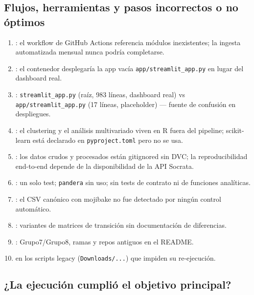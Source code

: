 \subsection{Flujos, herramientas y pasos incorrectos o no óptimos}

\begin{enumerate}
  \item {}: el workflow de GitHub Actions referencia módulos
        inexistentes; la ingesta automatizada mensual nunca podría completarse.
  \item {}: el contenedor desplegaría la app
        vacía \texttt{app/streamlit\_app.py} en lugar del dashboard real.
  \item {}: \texttt{streamlit\_app.py} (raíz, 983
        líneas, dashboard real) vs \texttt{app/streamlit\_app.py} (17 líneas,
        placeholder) — fuente de confusión en despliegues.
  \item {}: el clustering y el análisis multivariado
        viven en R fuera del pipeline; scikit-learn está declarado en
        \texttt{pyproject.toml} pero no se usa.
  \item {}: los datos crudos y procesados
        están gitignored sin DVC; la reproducibilidad end-to-end depende de la
        disponibilidad de la API Socrata.
  \item {}: un solo test; \texttt{pandera} sin uso;
        sin tests de contrato ni de funciones analíticas.
  \item {}: el CSV canónico con mojibake no fue detectado por
        ningún control automático.
  \item {}: variantes de matrices de transición sin
        documentación de diferencias.
  \item {}: Grupo7/Grupo8, ramas y repos
        antiguos en el README.
  \item {} en los scripts legacy (\texttt{Downloads/...})
        que impiden su re-ejecución.
\end{enumerate}

\subsection{¿La ejecución cumplió el objetivo principal?}

